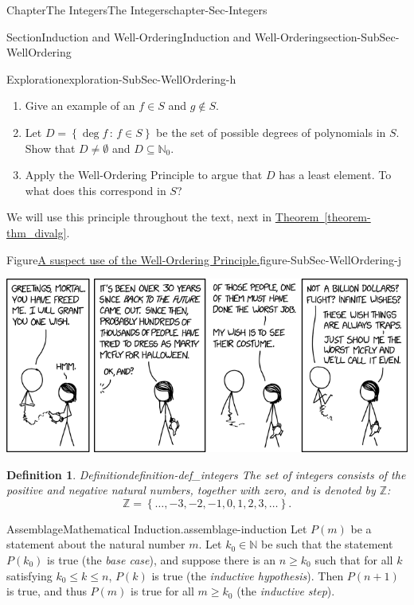 \documentclass[oneside,10pt,]{book}
\newcommand{\xreffont}{\relax}
\numberwithin{equation}{section}
\renewcommand{\le}{\leqslant}
\renewcommand{\ge}{\geqslant}
\newcommand{\set}[1]{\left\{ {#1} \right\}}
\newcommand{\setof}[2]{{\left\{#1\,\colon\,#2\right\}}}
\def\Z{{\mathbb Z}}
\def\N{{\mathbb N}}
\newtheorem{definition}[theorem]{Definition}
\begin{document}
\begin{chapterptx}{Chapter}{The Integers}{}{The Integers}{}{}{chapter-Sec-Integers}
\begin{sectionptx}{Section}{Induction and Well-Ordering}{}{Induction and Well-Ordering}{}{}{section-SubSec-WellOrdering}
\begin{exploration}{Exploration}{}{exploration-SubSec-WellOrdering-h}
%
\begin{enumerate}
\item{}Give an example of an \(f\in S\) and \(g\notin S\).%
\item{}Let \(D = \setof{\deg f}{f\in S}\) be the set of possible degrees of polynomials in \(S\). Show that \(D\ne \emptyset\) and \(D\subseteq \N_0\).%
\item{}Apply the Well-Ordering Principle to argue that \(D\) has a least element. To what does this correspond in \(S\)?%
\end{enumerate}
\end{exploration}%
We will use this principle throughout the text, next in \hyperref[theorem-thm_divalg]{Theorem~{\xreffont\ref{theorem-thm_divalg}}}.%
\begin{figureptx}{Figure}{\href{https://www.xkcd.com/2193/}{A suspect use of the Well-Ordering Principle.}\protect\footnotemark{}}{figure-SubSec-WellOrdering-j}{}%
\begin{image}{0.175}{0.65}{0.175}%
\includegraphics[width=\linewidth]{./images/well_ordering_principle.png}
\end{image}%
\tcblower
\end{figureptx}%
%
\begin{definition}{Definition}{}{definition-def_integers}%
\index{\(\Z\)} The set of integers consists of the positive and negative natural numbers, together with zero, and is denoted by \(\Z\):%
\begin{equation*}
\Z = \set{\ldots, -3, -2, -1, 0, 1, 2, 3, \ldots}\text{.}
\end{equation*}
%
\end{definition}
\begin{assemblage}{Assemblage}{Mathematical Induction.}{assemblage-induction}%
Let \(P(m)\) be a statement about the natural number \(m\)\footnotemark{}. Let \(k_0\in \N\) be such that the statement \(P(k_0)\) is true (the \emph{base case}), and suppose there is an \(n\ge k_0\) such that for all \(k\) satisfying \(k_0 \le k \le n\), \(P(k)\) is true (the \emph{inductive hypothesis}). Then \(P(n+1)\) is true, and thus \(P(m)\) is true for all \(m\ge k_0\) (the \emph{inductive step}).%

\end{assemblage}
\end{sectionptx}
\end{chapterptx}
\end{document}
